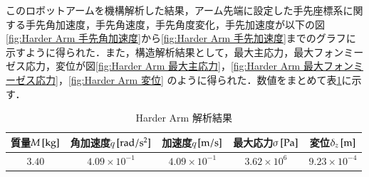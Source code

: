\documentclass[10pt,b5paper,papersize,dvipdfmx]{jsbook}
\begin{document}
このロボットアームを機構解析した結果，アーム先端に設定した手先座標系に関する手先角加速度，手先角速度，手先角度変化，手先加速度が以下の図\ref{fig:Harder Arm 手先角加速度}から\ref{fig:Harder Arm 手先加速度}までのグラフに示すように得られた．また，構造解析結果として，最大主応力，最大フォンミーゼス応力，変位が図\ref{fig:Harder Arm 最大主応力}，\ref{fig:Harder Arm 最大フォンミーゼス応力}，\ref{fig:Harder Arm 変位} のように得られた．数値をまとめて表\ref{tbl:Harder Arm 解析結果}に示す．
\begin{table}[htbp]
  \centering
  \caption{Harder Arm 解析結果}
  \label{tbl:Harder Arm 解析結果}
  \begin{tabular}{|c|c|c|c|c|} \hline
    質量$M\tani*{kg}$& 角加速度$\ddot{q}$$\tani*{rad/s^2}$& 加速度$\dot{q}$$\tani*{m/s}$& 最大応力$\sigma\tani*{Pa}$& 変位$\delta_z\tani*{m}$\\ \hline
    $3.40$&$4.09\times 10^{-1}$&$4.09\times 10^{-1}$&$3.62\times 10^6$&$9.23\times 10^{-4}$\\ \hline
  \end{tabular}
\end{table}
\end{document}

